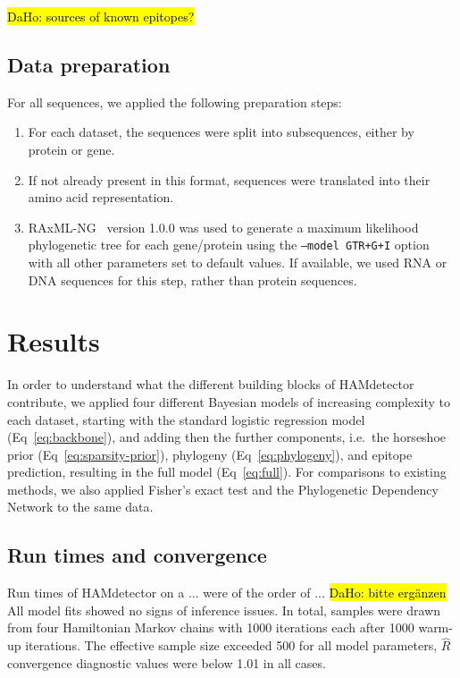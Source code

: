 \documentclass{bioinfo}
\begin{document}
\begin{methods}
\hl{DaHo: sources of known epitopes?}

\subsection{Data preparation}
For all sequences, we applied the following preparation steps:

\begin{enumerate}
  \item For each dataset, the sequences were split into subsequences, either by protein or gene.
  \item If not already present in this format, sequences were translated into their amino acid representation.
  \item RAxML-NG~\citep{Kozlov2019} version 1.0.0 was used to generate a maximum likelihood phylogenetic tree for each gene/protein using the \texttt{--model GTR+G+I} option with all other parameters set to default values. If available, we used RNA or DNA sequences for this step, rather than protein sequences.
\end{enumerate}

\end{methods}

\section{Results} \label{sec:results}

In order to understand what the different building blocks of HAMdetector contribute, we applied four different Bayesian models of increasing complexity to each dataset, starting with the standard logistic regression model (Eq~\ref{eq:backbone}), and adding then the further components, i.e.\ the horseshoe prior (Eq~\ref{eq:sparsity-prior}), phylogeny (Eq~\ref{eq:phylogeny}), and epitope prediction, resulting in the full model (Eq~\ref{eq:full}). For comparisons to existing methods, we also applied Fisher's exact test and the Phylogenetic Dependency Network \cite{Carlson2008} to the same data.

\subsection{Run times and convergence}
Run times of HAMdetector on a ... were of the order of ... \hl{DaHo: bitte ergänzen}
All model fits showed no signs of inference issues. In total, samples were drawn from four Hamiltonian Markov chains with 1000 iterations each after 1000 warm-up iterations. The effective sample size exceeded 500 for all model parameters, $\hat{R}$ convergence diagnostic values were below 1.01 in all cases.
\end{document}
